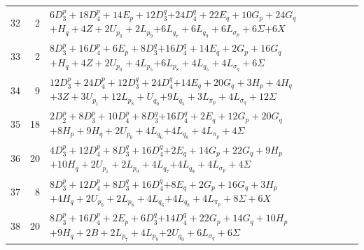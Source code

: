\documentclass[11pt,a4paper]{article}
\theoremstyle{remark}
\begin{document}
\begin{longtable}{rrp{12.7cm}}
32&2&\( 6D_3^p + 18D_4^p + 14E_p + 12D_3^q \)\newline\( + 24D_4^q + 22E_q + 10G_p + 24G_q \)\newline\( + H_q + 4Z + 2U_{p_{0}} + 2L_{p_{9}} \)\newline\( + 6L_{q_{7}} + 6L_{q_{9}} + 6L_{\sigma_p} + 6\Sigma \)\newline\( + 6X \)\\[3pt]
33&2&\( 8D_3^p + 16D_4^p + 6E_p + 8D_3^q \)\newline\( + 16D_4^q + 14E_q + 2G_p + 16G_q \)\newline\( + H_q + 4Z + 2U_{p_{0}} + 4L_{p_{5}} \)\newline\( + 6L_{p_{8}} + 4L_{q_{5}} + 4L_{\sigma_q} + 6\Sigma \)\\[3pt]
34&9&\( 12D_3^p + 24D_4^p + 12D_3^q + 24D_4^q \)\newline\( + 14E_q + 20G_q + 3H_p + 4H_q \)\newline\( + 3Z + 3U_{p_{1}} + 12L_{p_{8}} + U_{q_{0}} \)\newline\( + 9L_{q_{5}} + 3L_{\pi_p} + 4L_{\sigma_q} + 12\Sigma \)\\[3pt]
35&18&\( 2D_2^p + 8D_3^p + 10D_4^p + 8D_3^q \)\newline\( + 16D_4^q + 2E_q + 12G_p + 20G_q \)\newline\( + 8H_p + 9H_q + 2U_{p_{0}} + 4L_{q_{6}} \)\newline\( + 4L_{q_{8}} + 4L_{\pi_p} + 4\Sigma \)\\[3pt]
36&20&\( 4D_3^p + 12D_4^p + 8D_3^q + 16D_4^q \)\newline\( + 2E_q + 14G_p + 22G_q + 9H_p \)\newline\( + 10H_q + 2U_{p_{1}} + 2L_{p_{9}} + 4L_{q_{7}} \)\newline\( + 4L_{q_{9}} + 4L_{\sigma_p} + 4\Sigma \)\\[3pt]
37&8&\( 8D_3^p + 12D_4^p + 8D_3^q + 16D_4^q \)\newline\( + 8E_q + 2G_p + 16G_q + 3H_p \)\newline\( + 4H_q + 2U_{p_{0}} + 2L_{p_{8}} + 4L_{q_{6}} \)\newline\( + 4L_{q_{8}} + 4L_{\pi_p} + 8\Sigma + 6X \)\\[3pt]
38&20&\( 8D_3^p + 16D_4^p + 2E_p + 6D_3^q \)\newline\( + 14D_4^q + 22G_p + 14G_q + 10H_p \)\newline\( + 9H_q + 2B + 2L_{p_{7}} + 4L_{p_{8}} \)\newline\( + 2U_{q_{0}} + 6L_{\sigma_q} + 6\Sigma \)\\[3pt]

\end{longtable}
\end{document}
